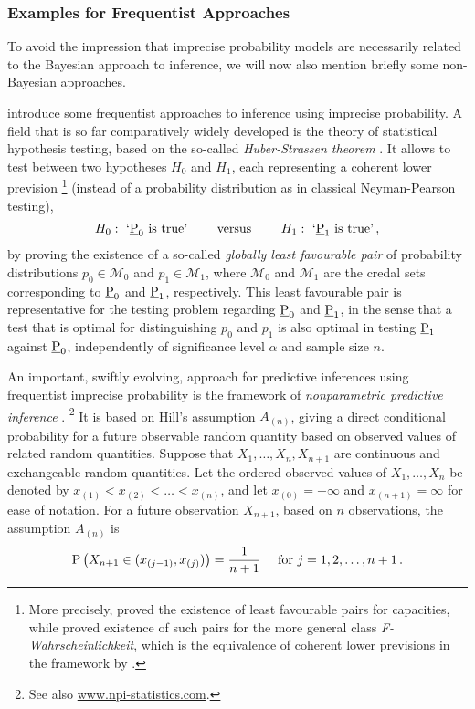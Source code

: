 \subsubsection{Examples for Frequentist Approaches}
\label{sec:frequentist}

To avoid the impression that imprecise probability models are necessarily related
to the Bayesian approach to inference,
we will now also mention briefly some non-Bayesian approaches.

\textcite[\S 5]{itip-statinf} introduce some frequentist approaches to inference using imprecise probability.
A field that is so far comparatively widely developed
is the theory of statistical hypothesis testing,
based on the so-called \emph{Huber-Strassen theorem} \parencite[Theorem~4.1]{1973:huberstrassen}.
It allows to test between two hypotheses $H_0$ and $H_1$,
each representing a coherent lower prevision%
\footnote{More precisely, \textcite{1973:huberstrassen} proved the existence of least favourable pairs
for capacities, while \textcite{1998:augustin} proved existence of such pairs
for the more general class \emph{F-Wahrscheinlichkeit},
which is the equivalence of coherent lower previsions in the framework by \textcite{2001:weichselberger}.}
(instead of a probability distribution as in classical Neyman-Pearson testing),
\begin{align*}
H_0:\ `\underline{\operatorname{P}}_0 \text{ is true'  \qquad versus \qquad } H_1:\   `\underline{\operatorname{P}}_1 \text{ is true'}\,,
\end{align*}
by proving the existence of a so-called \emph{globally least favourable pair}
of probability distributions $p_0 \in \mathcal{M}_0$ and $p_1 \in \mathcal{M}_1$,
where $\mathcal{M}_0$ and $\mathcal{M}_1$ are the credal sets
corresponding to $\underline{\operatorname{P}}_0$ and $\underline{\operatorname{P}}_1$, respectively.
This least favourable pair is representative for the testing problem regarding $\underline{\operatorname{P}}_0$ and $\underline{\operatorname{P}}_1$,
in the sense that a test that is optimal for distinguishing $p_0$ and $p_1$
is also optimal in testing $\underline{\operatorname{P}}_1$ against $\underline{\operatorname{P}}_0$,
independently of significance level $\alpha$ and sample size $n$.


An important, swiftly evolving, approach for predictive inferences using frequentist imprecise probability
is the framework of \emph{nonparametric predictive inference} \parencite[NPI,][]{2004:augustin, 2006b:Coolen}.%
\footnote{See also \url{www.npi-statistics.com}.}
It is based on Hill's \parencite*{1968:hill} assumption $A_{(n)}$,
giving a direct conditional probability for a future observable random quantity
based on observed values of related random quantities.
Suppose that $X_1, \ldots, X_n, X_{n+1}$ are continuous and exchangeable random quantities.
Let the ordered observed values of $X_1, \ldots, X_n$ be denoted by $x_{(1)} < x_{(2)} < \ldots < x_{(n)}$,
and let $x_{(0)}=-\infty$ and $x_{(n+1)}=\infty$ for ease of notation.
For a future observation $X_{n+1}$, based on $n$ observations, the assumption $A_{(n)}$ \parencite{1968:hill} is
\begin{align*}
\operatorname{P}\big(X_{n+1} \in (x_{(j-1)},x_{(j)})\big) = \frac{1}{n+1} \quad \text{ for } j=1,2,\ldots,n+1\,.
\end{align*}

